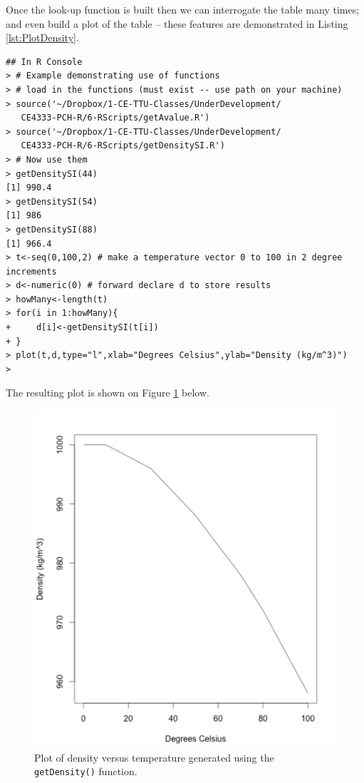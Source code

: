 Once the look-up function is built then we can  interrogate the table many times; and even build a plot of the table -- these features are demonstrated in Listing \ref{lst:PlotDensity}.

\begin{lstlisting}[caption=R code demonstrating use of getDensitySI(), label=lst:PlotDensity]
## In R Console  
> # Example demonstrating use of functions
> # load in the functions (must exist -- use path on your machine)
> source('~/Dropbox/1-CE-TTU-Classes/UnderDevelopment/
   CE4333-PCH-R/6-RScripts/getAvalue.R')
> source('~/Dropbox/1-CE-TTU-Classes/UnderDevelopment/
   CE4333-PCH-R/6-RScripts/getDensitySI.R')
> # Now use them
> getDensitySI(44)
[1] 990.4
> getDensitySI(54)
[1] 986
> getDensitySI(88)
[1] 966.4
> t<-seq(0,100,2) # make a temperature vector 0 to 100 in 2 degree increments
> d<-numeric(0) # forward declare d to store results
> howMany<-length(t)
> for(i in 1:howMany){
+     d[i]<-getDensitySI(t[i])
+ }
> plot(t,d,type="l",xlab="Degrees Celsius",ylab="Density (kg/m^3)")
> 
\end{lstlisting}  

The resulting plot is shown on Figure \ref{fig:PlotDensity} below.
\begin{figure}[htbp] %
   \centering
   \includegraphics[width=5in]{./2-Algorithms/PlotDensity.jpg} 
   \caption{Plot of density versus temperature generated using the \texttt{getDensity()} function.}
   \label{fig:PlotDensity}
\end{figure}

